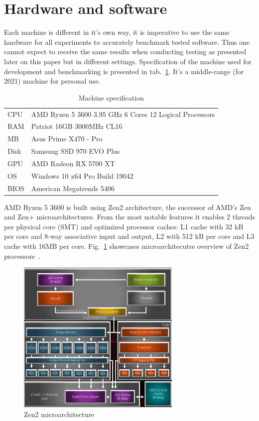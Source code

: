 \clearpage
\section{Hardware and software} 
Each machine is different in it's own way, it is imperative to use the same hardware for all experiments to accurately benchmark tested software. Thus one cannot expect to receive the same results when conducting testing as presented later on this paper but in different settings. Specification of the machine used for development and benchmarking is presented in tab.~\ref{tab:HardSpec}. It's a middle-range (for 2021) machine for personal use.
\begin{table}[!ht]
    \centering
    \caption{Machine specification}
		\label{tab:HardSpec}
    \begin{tabular}{ll}
			\toprule
			CPU  & AMD Ryzen 5 3600 3.95 GHz 6 Cores 12 Logical Processors \\
			RAM  & Patriot 16GB 3000MHz CL16 \\ 
			MB   & Asus Prime X470 - Pro \\ 
			Disk & Samsung SSD 970 EVO Plus \\
			GPU  & AMD Radeon RX 5700 XT \\ 
			OS   & Windows 10 x64 Pro Build 19042 \\ 
			BIOS & American Megatrends 5406 \\ 
			\bottomrule
    \end{tabular}
\end{table}

AMD Ryzen 5 3600 is built using Zen2 architecture,  the successor of AMD's Zen and Zen+ microarchitectures. From the most notable features it enables 2 threads per physical core (SMT) and optimized processor caches: L1 cache with 32 kB  per core and 8-way associative input and output, L2 with 512 kB per core and L3 cache with 16MB per core. Fig.~\ref{fig:Zen} showcases microarchitecutre overview of Zen2 processors~\cite{Zen}.

\begin{figure}[!ht]
	\centering
		\includegraphics[width = 0.7\textwidth]{figures03/Zen.PNG}
	\caption{Zen2 microarchitecture}
	\label{fig:Zen}
\end{figure}

